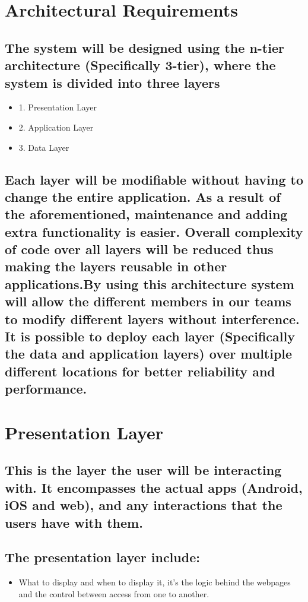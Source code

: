 \documentclass{article}
\begin{document}
\section{Architectural Requirements}

	\subsection{The system will be designed using the n-tier architecture (Specifically 3-tier), where the system is divided into three layers}
  \begin{itemize}
    \item 1. Presentation Layer
    \item 2. Application Layer
    \item 3. Data Layer
  \end{itemize}
  \subsection{Each layer will be modifiable without having to change the entire application. As a result of the aforementioned, maintenance and adding extra functionality is easier. Overall complexity of code over all layers will be reduced thus making the layers reusable in other applications.By using this architecture system will allow the different members in our teams to modify different layers without interference. It is possible to deploy each layer (Specifically the data and application layers) over multiple different locations for better reliability and performance.}
  
  \section{Presentation Layer}
    \subsection{This is the layer the user will be interacting with. It encompasses the actual apps (Android, iOS and web), and any interactions that the users have with them.}
    \subsection{The presentation layer include:  }
  \begin{itemize}
    \item What to display and when to display it, it’s the logic behind the webpages and the control between access from one to another.
  \end{itemize}
  
\end{document}
